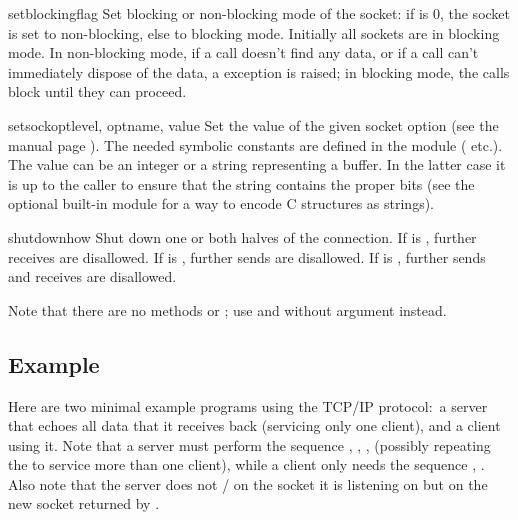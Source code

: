 \begin{methoddesc}[socket]{setblocking}{flag}
Set blocking or non-blocking mode of the socket: if  is 0,
the socket is set to non-blocking, else to blocking mode.  Initially
all sockets are in blocking mode.  In non-blocking mode, if a
 call doesn't find any data, or if a
 call can't immediately dispose of the data, a
 exception is raised; in blocking mode, the calls
block until they can proceed.
\end{methoddesc}

\begin{methoddesc}[socket]{setsockopt}{level, optname, value}
Set the value of the given socket option (see the \UNIX{} manual page
).  The needed symbolic constants are defined in
the  module ( etc.).  The value can be an
integer or a string representing a buffer.  In the latter case it is
up to the caller to ensure that the string contains the proper bits
(see the optional built-in module
 for a way to encode C
structures as strings). 
\end{methoddesc}

\begin{methoddesc}[socket]{shutdown}{how}
Shut down one or both halves of the connection.  If  is
, further receives are disallowed.  If  is ,
further sends are disallowed.  If  is , further sends
and receives are disallowed.
\end{methoddesc}

Note that there are no methods  or ;
use  and  without  argument
instead.


\subsection{Example \label{socket-example}}

Here are two minimal example programs using the TCP/IP protocol:\ a
server that echoes all data that it receives back (servicing only one
client), and a client using it.  Note that a server must perform the
sequence , , ,
 (possibly repeating the  to service
more than one client), while a client only needs the sequence
, .  Also note that the server
does not / on the 
socket it is listening on but on the new socket returned by
.

